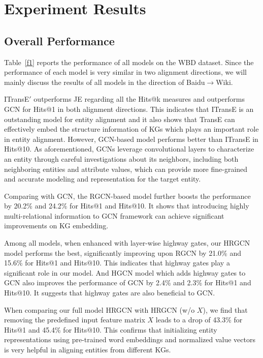 


	\section{Experiment Results}
	
	
	\subsection{Overall Performance}
    Table~\ref{f1} reports the performance of all models on the WBD dataset. Since the performance of each model is very similar in two alignment directions, we will mainly discuss the results of all models in the direction of Baidu$\rightarrow$Wiki. 
    
    ITransE$'$ outperforms JE regarding all the Hits@k measures and outperforms GCN for Hits@1 in both alignment directions. This indicates that ITransE is an
outstanding model for entity alignment and it also shows that TransE can effectively embed the structure information of KGs which plays an
important role in entity alignment. However, GCN-based model performs better than ITransE in Hits@10. As aforementioned, GCNs
leverage convolutional layers to characterize an entity through careful investigations about its neighbors, including both neighboring
entities and attribute values, which can provide more fine-grained and accurate modeling and representation for the target entity.


	Comparing with GCN, the RGCN-based model further boosts the performance by 20.2\% and 24.2\% for Hits@1 and Hits@10. It shows that introducing highly multi-relational information to GCN framework can achieve significant improvements on KG embedding.
	
	Among all models, when enhanced with layer-wise highway gates, our HRGCN model performs the best, significantly improving upon RGCN by 21.0\% and 15.6\% for Hits@1 and Hits@10. This indicates that highway gates play a significant role in our model. And HGCN model which adds highway gates to GCN also improves the performance of GCN by 2.4\% and 2.3\% for Hits@1 and Hits@10. It suggests that highway gates are also beneficial to GCN. 
	
	When comparing our full model HRGCN with HRGCN (w/o $X$), we find that removing the predefined input feature matrix $X$ leads to a drop of 43.3\% for Hits@1 and 45.4\% for Hits@10. This confirms that initializing entity representations using pre-trained word embeddings and normalized value vectors is very helpful in aligning entities from different KGs.
	
